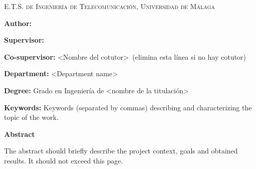 
\pagestyle{fancy}

\begin{center}
	\scshape
	E.T.S. de Ingeniería de Telecomunicación, Universidad de Málaga
\end{center}

\bigskip

\begin{center}
	\Large \scshape
	\textbf{\tfgtitlenameENG}
\end{center}

\bigskip \bigskip \bigskip

\begin{minipage}{\textwidth}

\textbf{Author:} \tfgauthorname

\medskip

\textbf{Supervisor:} \tfgtutorname

\medskip

\textbf{Co-supervisor:} <Nombre del cotutor>\ (elimina esta línea si no hay cotutor)

\medskip

\textbf{Department:} <Department name>

\medskip

\textbf{Degree:} Grado en Ingeniería de <nombre de la titulación>

\medskip

\textbf{Keywords:} Keywords (separated by commas) describing and characterizing the topic of the work.

\bigskip \bigskip


\end{minipage}

\begin{center}
	\textbf{Abstract}
\end{center}

The abstract should briefly describe the project context, goals and
obtained results. It should not exceed this page.

\blankpage